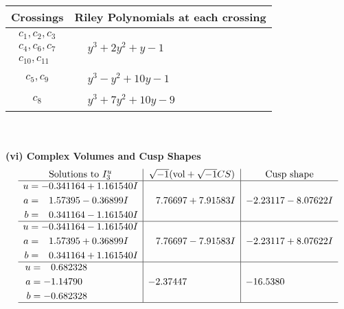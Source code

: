 \documentclass[1p]{elsarticle_modified}
\theoremstyle{definition}
\newcommand{\I}{\sqrt{-1}}
\begin{document}
\begin{tabular}{m{50pt}|m{274pt}}
Crossings & \hspace{64pt}Riley Polynomials at each crossing \\
\hline $$\begin{aligned}c_{1},c_{2},c_{3}\\c_{4},c_{6},c_{7}\\c_{10},c_{11}\end{aligned}$$&$\begin{aligned}
&y^3+2 y^2+y-1
\end{aligned}$\\
\hline $$\begin{aligned}c_{5},c_{9}\end{aligned}$$&$\begin{aligned}
&y^3- y^2+10 y-1
\end{aligned}$\\
\hline $$\begin{aligned}c_{8}\end{aligned}$$&$\begin{aligned}
&y^3+7 y^2+10 y-9
\end{aligned}$\\
\hline
\end{tabular}\\~\\
\newpage\flushleft \textbf{(vi) Complex Volumes and Cusp Shapes}
$$\begin{array}{c|c|c}  
\text{Solutions to }I^u_{3}& \I (\text{vol} + \sqrt{-1}CS) & \text{Cusp shape}\\
 \hline 
\begin{aligned}
u &= -0.341164 + 1.161540 I \\
a &= \phantom{-}1.57395 - 0.36899 I \\
b &= \phantom{-}0.341164 - 1.161540 I\end{aligned}
 & \phantom{-}7.76697 + 7.91583 I & -2.23117 - 8.07622 I \\ \hline\begin{aligned}
u &= -0.341164 - 1.161540 I \\
a &= \phantom{-}1.57395 + 0.36899 I \\
b &= \phantom{-}0.341164 + 1.161540 I\end{aligned}
 & \phantom{-}7.76697 - 7.91583 I & -2.23117 + 8.07622 I \\ \hline\begin{aligned}
u &= \phantom{-}0.682328\phantom{ +0.000000I} \\
a &= -1.14790\phantom{ +0.000000I} \\
b &= -0.682328\phantom{ +0.000000I}\end{aligned}
 & -2.37447\phantom{ +0.000000I} & -16.5380\phantom{ +0.000000I}\\
 \hline 
 \end{array}$$\newpage\newpage\renewcommand{\arraystretch}{1}
\end{document}
